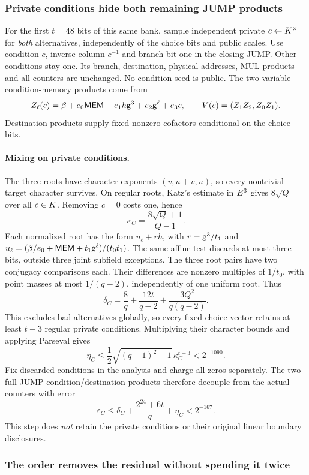 \subsubsection{Private conditions hide both remaining JUMP products}

For the first $t=48$ bits of this same bank, sample independent private $c\gets K^\times$ for \emph{both} alternatives, independently of the choice bits and public scales. Use condition $c$, inverse column $c^{-1}$ and branch bit one in the closing JUMP. Other conditions stay one. Its branch, destination, physical addresses, MUL products and all counters are unchanged. No condition seed is public. The two variable condition-memory products come from
\[
 Z_\ell(c)=\beta+e_0\mathsf{MEM}+e_1h\mathsf{g}^3+e_2\mathsf{g}^\ell+e_3c,
 \qquad V(c)=(Z_1Z_2,Z_0Z_1).
\]
Destination products supply fixed nonzero cofactors conditional on the choice bits.

\paragraph{Mixing on private conditions.} The three roots have character exponents $(v,u+v,u)$, so every nontrivial target character survives. On regular roots, Katz's estimate in $E^3$ gives $8\sqrt Q$ over all $c\in K$. Removing $c=0$ costs one, hence
\[
 \kappa_C=\frac{8\sqrt Q+1}{Q-1}.
\]
Each normalized root has the form $u_\ell+rh$, with $r=\mathsf{g}^3/t_1$ and $u_\ell=(\beta/e_0+\mathsf{MEM}+t_1\mathsf{g}^\ell)/(t_0t_1)$. The same affine test discards at most three bits, outside three joint subfield exceptions. The three root pairs have two conjugacy comparisons each. Their differences are nonzero multiples of $1/t_0$, with point masses at most $1/(q-2)$, independently of one uniform root. Thus
\[
 \delta_C=\frac8q+\frac{12t}{q-2}+\frac{3Q^2}{q(q-2)}.
\]
This excludes bad alternatives globally, so every fixed choice vector retains at least $t-3$ regular private conditions. Multiplying their character bounds and applying Parseval gives
\[
 \eta_C\le\frac12\sqrt{(q-1)^2-1}\,\kappa_C^{t-3}<2^{-1090}.
\]
Fix discarded conditions in the analysis and charge all zeros separately. The two full JUMP condition/destination products therefore decouple from the actual counters with error
\[
 \varepsilon_C\le\delta_C+\frac{2^{24}+6t}{q}+\eta_C<2^{-167}.
\]
This step does \emph{not} retain the private conditions or their original linear boundary disclosures.

\subsubsection{The order removes the residual without spending it twice}

